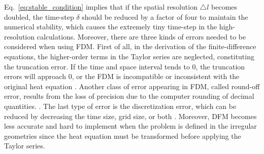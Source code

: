 Eq.~\ref{eq:stable_condition} implies that if the spatial resolution
$\triangle l$ becomes doubled, the time-step $\delta$ should be
reduced by a factor of four to maintain the numerical stability, which
causes the extremely tiny time-step in the high-resolution
calculations. Moreover, there are three kinds of errors needed to be
considered when using FDM. First of all, in the derivation of the
finite-difference equations, the higher-order terms in the Taylor
series are neglected, constituting the truncation error. If the time
and space interval tends to $0$, the truncation errors will approach
$0$, or the FDM is incompatible or inconsistent with the original heat
equation \cite{crank1979mathematics}. Another class of error appearing
in FDM, called round-off error, results from the loss of precision due
to the computer rounding of decimal
quantities. \cite{hoffman2018numerical}. The last type of error is the
discretization error, which can be reduced by decreasing the time
size, grid size, or both \cite{crank1979mathematics}. Moreover, DFM
becomes less accurate and hard to implement when the problem is
defined in the irregular geometries since the heat equation must be
transformed before applying the Taylor series.


